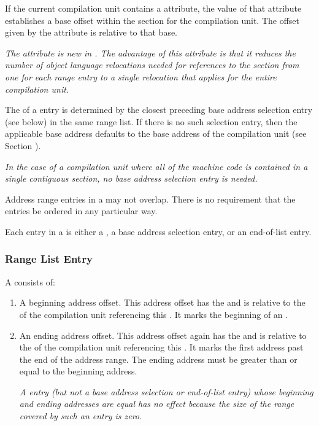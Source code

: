 If the current compilation unit contains a \DWATrangesbase{}
attribute, the value of that attribute establishes a base
offset within the \dotdebugranges{} section for the compilation
unit. The offset given by the \DWATranges{} attribute is
relative to that base.

\textit{The \DWATrangesbase{} attribute is new in \DWARFVersionV.
The advantage of this attribute is that it reduces the number of
object language relocations needed for references to the \dotdebugranges{}
section from one for each range entry to a single relocation that
applies for the entire compilation unit.}

The  of a  
entry is determined
by the closest preceding base address selection entry (see
below) in the same range list. If there is no such selection
entry, then the applicable base address defaults to the base
address of the compilation unit 
(see Section ).

\textit{In the case of a compilation unit where all of the machine
code is contained in a single contiguous section, no base
address selection entry is needed.}

Address range entries in a  may not overlap.
There is no requirement that the entries be ordered in any particular way.

Each entry in a  is either a 
,
a base address selection entry, or an 
end-of-list entry.

\subsubsection{Range List Entry}
A  consists of:
\begin{enumerate}[1. ]
\item A beginning address offset. This address offset has the 
 and is relative to
the  of the compilation unit referencing this 
. 
It marks the beginning of an 
. 

\item An ending address offset. This address offset again has the 
 and is relative
to the  of the compilation unit referencing 
this .
It marks the first address past the end of the address range.
The ending address must be greater than or
equal to the beginning address.

\textit{A  entry (but not a base address 
selection or end-of-list entry) whose beginning and
ending addresses are equal has no effect because the size of the 
range covered by such an entry is zero.}
\end{enumerate}

